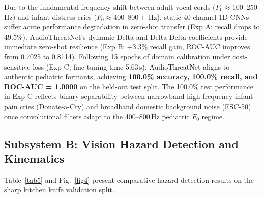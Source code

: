 \documentclass[conference]{IEEEtran}
\begin{document}
Due to the fundamental frequency shift between adult vocal cords ($F_0 \approx 100\text{--}250$\,Hz) and infant distress cries ($F_0 \approx 400\text{--}800+$\,Hz), static 40-channel 1D-CNNs suffer acute performance degradation in zero-shot transfer (Exp A: recall drops to 49.5\%). AudioThreatNet's dynamic Delta and Delta-Delta coefficients provide immediate zero-shot resilience (Exp B: +3.3\% recall gain, ROC-AUC improves from 0.7025 to 0.8114). Following 15 epochs of domain calibration under cost-sensitive loss (Exp C, fine-tuning time 5.63\,s), AudioThreatNet aligns to authentic pediatric formants, achieving \textbf{100.0\% accuracy, 100.0\% recall, and ROC-AUC = 1.0000} on the held-out test split. The 100.0\% test performance in Exp C reflects binary separability between narrowband high-frequency infant pain cries (Donate-a-Cry) and broadband domestic background noise (ESC-50) once convolutional filters adapt to the 400--800\,Hz pediatric $F_0$ regime.

\subsection{Subsystem B: Vision Hazard Detection and Kinematics}
Table~\ref{tab5} and Fig.~\ref{fig4} present comparative hazard detection results on the sharp kitchen knife validation split.

\begin{table}[htbp]
\caption{Comparative Hazard-Detection Benchmark (Validation Split)}
\centering
\renewcommand{\arraystretch}{0.90}
\label{tab5}
\end{table}
\end{document}
